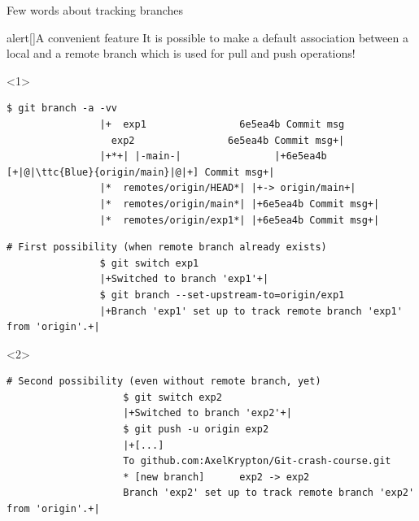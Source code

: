 \documentclass[usenames,svgnames,14pt]{beamer}
\newcommand{\ttc}[2]{\texttt{\textcolor{#1}{#2}}}%
\begin{document}
\begin{frame}[fragile]{Few words about tracking branches}
    \vspace{-8mm}
    \begin{overlayarea}{\textwidth}{0.85\textheight}
        \begin{varblock}{alert}[\textwidth]{A convenient feature}
            It is possible to make a default association between a local and a remote branch which is used for pull and push operations!
        \end{varblock}
        \begin{onlyenv}<1>
            \begin{lstlisting}[style=MyBash, xrightmargin=-1mm, xleftmargin=-1mm]
                $ git branch -a -vv
                |+  exp1                6e5ea4b Commit msg
                  exp2                6e5ea4b Commit msg+|
                |+*+| |-main-|                |+6e5ea4b [+|@|\ttc{Blue}{origin/main}|@|+] Commit msg+|
                |*  remotes/origin/HEAD*| |+-> origin/main+|
                |*  remotes/origin/main*| |+6e5ea4b Commit msg+|
                |*  remotes/origin/exp1*| |+6e5ea4b Commit msg+|
            \end{lstlisting}
            \begin{lstlisting}[style=MyBash, xrightmargin=-1mm, xleftmargin=-1mm]
                # First possibility (when remote branch already exists)
                $ git switch exp1
                |+Switched to branch 'exp1'+|
                $ git branch --set-upstream-to=origin/exp1
                |+Branch 'exp1' set up to track remote branch 'exp1' from 'origin'.+|
            \end{lstlisting}
        \end{onlyenv}
        \begin{overlayarea}{\textwidth}{0.35\textheight}
            \vspace{-2mm}
            \begin{onlyenv}<2>
                \begin{lstlisting}[style=MyBash, xrightmargin=-1mm, xleftmargin=-1mm]
                    # Second possibility (even without remote branch, yet)
                    $ git switch exp2
                    |+Switched to branch 'exp2'+|
                    $ git push -u origin exp2
                    |+[...]
                    To github.com:AxelKrypton/Git-crash-course.git
                    * [new branch]      exp2 -> exp2
                    Branch 'exp2' set up to track remote branch 'exp2' from 'origin'.+|

\end{lstlisting}
\end{onlyenv}
\end{overlayarea}
\end{overlayarea}
\end{frame}
\end{document}
